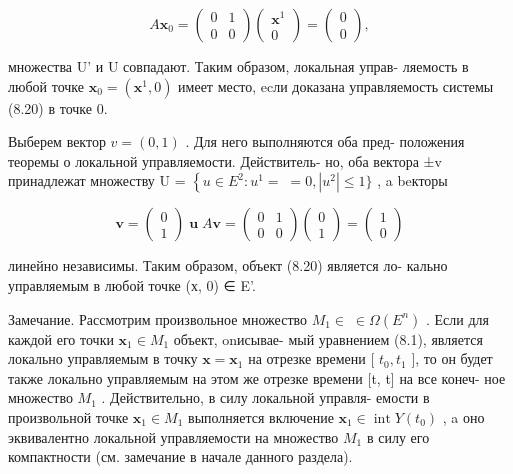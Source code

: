 \documentclass[8pt]{extarticle}
\begin{document}
\[
A{\mathbf{x}}_{0} = \left( \begin{array}{ll} 0 & 1 \\  0 & 0 \end{array}\right) \left( \begin{array}{l} {\mathbf{x}}^{1} \\  0 \end{array}\right)  = \left( \begin{array}{l} 0 \\  0 \end{array}\right) ,
\]

множества U’ и U совпадают. Таким образом, локальная управ- ляемость в любой точке \({\mathbf{x}}_{0} = \left( {{\mathbf{x}}^{1},0}\right)\) имеет место, ecли доказана управляемость системы (8.20) в точке 0.

Выберем вектор \(v = \left( {0,1}\right)\) . Для него выполняются оба пред- положения теоремы о локальной управляемости. Действитель- но, оба вектора ±v принадлежат множеству U = \(\left\{  {u \in  {E}^{2} : {u}^{1} = }\right. \; = 0,\left| {u}^{2}\right|  \leq  1\}\) , a beкторы

\[
\mathbf{v} = \left( \begin{array}{l} 0 \\  1 \end{array}\right) \;\mathbf{u}\;A\mathbf{v} = \left( \begin{array}{ll} 0 & 1 \\  0 & 0 \end{array}\right) \left( \begin{array}{l} 0 \\  1 \end{array}\right)  = \left( \begin{array}{l} 1 \\  0 \end{array}\right)
\]

линейно независимы. Таким образом, объект (8.20) является ло- кально управляемым в любой точке (х, 0) ∈ E’.

Замечание. Рассмотрим произвольное множество \({M}_{1} \in \; \in  \Omega \left( {E}^{n}\right)\) . Если для каждой его точки \({\mathbf{x}}_{1} \in  {M}_{1}\) объект, onисывае- мый уравнением (8.1), является локально управляемым в точку \(\mathbf{x} = {\mathbf{x}}_{1}\) на отрезке времени [ \({t}_{0},{t}_{1}\) ], то он будет также локально управляемым на этом же отрезке времени [t, t] на все конеч- ное множество \({M}_{1}\) . Действительно, в силу локальной управля- емости в произвольной точке \({\mathbf{x}}_{1} \in  {M}_{1}\) выполняется включение \({\mathbf{x}}_{1} \in  \operatorname{int}Y\left( {t}_{0}\right)\) , a оно эквивалентно локальной управляемости на множество \({M}_{1}\) в силу его компактности (см. замечание в начале данного раздела).
\end{document}
